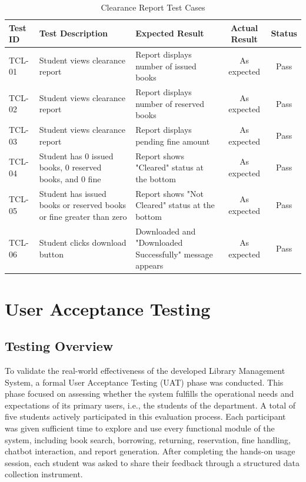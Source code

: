 \documentclass[12pt,a4paper]{report}
\begin{document}
\begin{table}[H]
\centering
\begin{tabularx}{\textwidth}{|l|X|X|c|c|}
\hline
\textbf{Test ID} & \textbf{Test Description} & \textbf{Expected Result} & \textbf{Actual Result} & \textbf{Status} \\
\hline
TCL-01 & Student views clearance report & Report displays number of issued books & As expected & Pass \\
\hline
TCL-02 & Student views clearance report & Report displays number of reserved books & As expected & Pass \\
\hline
TCL-03 & Student views clearance report & Report displays pending fine amount & As expected & Pass \\
\hline
TCL-04 & Student has 0 issued books, 0 reserved books, and 0 fine & Report shows "Cleared" status at the bottom & As expected & Pass \\
\hline
TCL-05 & Student has issued books or reserved books or fine greater than zero & Report shows "Not Cleared" status at the bottom & As expected & Pass \\
\hline
TCL-06 & Student clicks download button & Downloaded and "Downloaded Successfully" message appears & As expected & Pass \\
\hline
\end{tabularx}
\caption{Clearance Report Test Cases}
\label{tab:clearcases}
\end{table}




\newpage

\section{User Acceptance Testing}

\subsection{Testing Overview}

To validate the real-world effectiveness of the developed Library Management System, a formal User Acceptance Testing (UAT) phase was conducted. This phase focused on assessing whether the system fulfills the operational needs and expectations of its primary users, i.e., the students of the department. A total of five students actively participated in this evaluation process. Each participant was given sufficient time to explore and use every functional module of the system, including book search, borrowing, returning, reservation, fine handling, chatbot interaction, and report generation. After completing the hands-on usage session, each student was asked to share their feedback through a structured data collection instrument.
\end{document}

